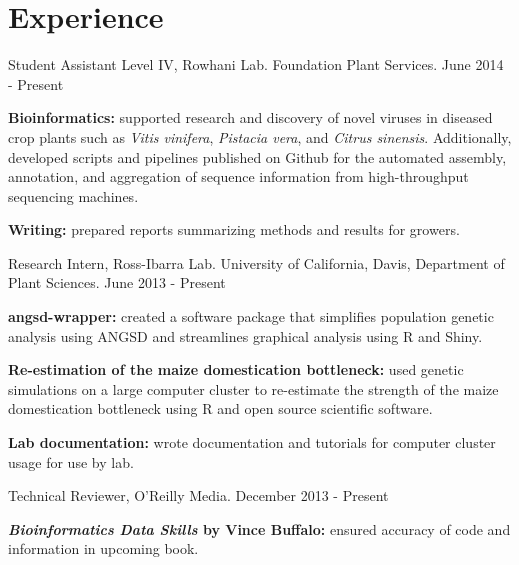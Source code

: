 \documentclass[letterpaper]{article}
\renewenvironment{itemize}{
  \begin{list}{}{
    \setlength{\leftmargin}{1.5em}
  }
}{
  \end{list}
}
\begin{document}
\section*{Experience}
\begin{itemize}
\item Student Assistant Level IV, Rowhani Lab. Foundation Plant Services. \hfill June 2014 - Present
	\begin{itemize}
	\item \textbf{Bioinformatics:} supported research and discovery of novel viruses in diseased crop plants such as \textit{Vitis vinifera}, \textit{Pistacia vera}, and \textit{Citrus sinensis}. Additionally, developed scripts and pipelines published on Github for the automated assembly, annotation, and aggregation of sequence information from high-throughput sequencing machines.
	\item \textbf{Writing:} prepared reports summarizing methods and results for growers.
	\end{itemize}
\item Research Intern, Ross-Ibarra Lab. University of California, Davis, Department of Plant Sciences. \hfill June 2013 - Present
	\begin{itemize}
	\item \textbf{angsd-wrapper:} created a software package that simplifies population genetic analysis using ANGSD and streamlines graphical analysis using R and Shiny.
	\item \textbf{Re-estimation of the maize domestication bottleneck:} used genetic simulations on a large computer cluster to re-estimate the strength of the maize domestication bottleneck using R and open source scientific software.
	\item \textbf{Lab documentation:} wrote documentation and tutorials for computer cluster usage for use by lab. 
	\end{itemize}
\item Technical Reviewer, O'Reilly Media. \hfill December 2013 - Present
	\begin{itemize}
	\item \textbf{\textit{Bioinformatics Data Skills} by Vince Buffalo:} ensured accuracy of code and information in upcoming book.

\end{itemize}
\end{itemize}
\end{document}
